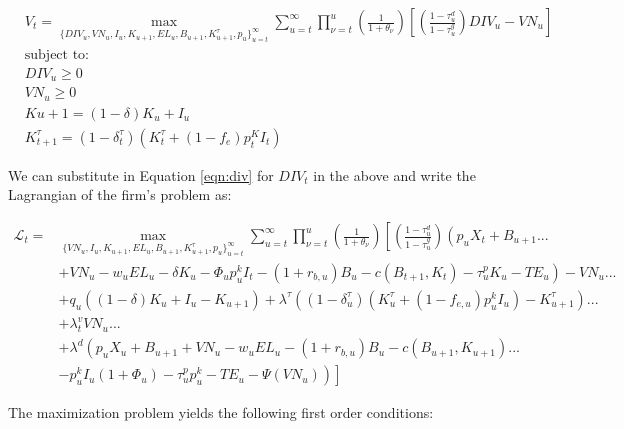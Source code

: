 \begin{equation}
\label{eqn:V_max}
\begin{split}
        &V_{t}= \max_{\{DIV_{u},VN_{u}, I_{u}, K_{u+1}, EL_{u}, B_{u+1}, K^{\tau}_{u+1},p_{u}\}^{\infty}_{u=t}} \sum_{u=t}^{\infty} \prod_{\nu=t}^{u}\left(\frac{1}{1+\theta_{\nu}}\right)\left[ \left(\frac{1-\tau^{d}_{u}}{1-\tau^{g}_{u}}\right)DIV_{u}-VN_{u}\right]\\
        &\text{subject to:} \\
        &DIV_{u}\geq 0\\
        &VN_{u}\geq 0\\
        &K{u+1}=(1-\delta)K_{u}+ I_{u} \\
        &K^{\tau}_{t+1}=(1-\delta^{\tau}_{t})(K^{\tau}_{t} + (1-f_{e})p^{K}_{t}I_{t})
      \end{split}
    \end{equation}

We can substitute in Equation \ref{eqn:div} for $DIV_{t}$ in the above and write the Lagrangian of the firm's problem as:

 \begin{equation}
\label{eqn:lagrangian}
\begin{split}
\mathcal{L}_{t} =& \max_{\{VN_{u}, I_{u}, K_{u+1}, EL_{u}, B_{u+1}, K^{\tau}_{u+1},p_{u}\}^{\infty}_{u=t}}   \sum_{u=t}^{\infty} \prod_{\nu=t}^{u}\left(\frac{1}{1+\theta_{\nu}}\right) \left[ \left(\frac{1-\tau^{d}_{u}}{1-\tau^{g}_{u}}\right) \left(p_{u}X_{t}+ B_{u+1}... \right. \right. \\
& \left. \left.  + VN_{u}-w_{u}EL_{u}-\delta K_{u} -\Phi_{u}p^{k}_{u}I_{t}-(1+r_{b,u})B_{u} - c(B_{t+1},K_{t})-\tau^{p}_{u}K_{u}-TE_{u}\right)  - VN_{u} ...\right. \\
&\left. + q_{u}\left((1-\delta)K_{u}+I_{u}-K_{u+1}\right) + \lambda^{\tau}\left((1-\delta^{\tau}_{u})(K^{\tau}_{u}+(1-f_{e,u})p^{k}_{u}I_{u})-K^{\tau}_{u+1}\right) ...\right. \\
& \left.+ \lambda^{v}_{t}VN_{u} ... \right. \\
& \left. + \lambda^{d}\left(p_{u}X_{u}+ B_{u+1} + VN_{u} - w_{u}EL_{u} - (1+r_{b,u})B_{u} - c(B_{u+1},K_{u+1})... \right.\right.\\
& \left.\left. - p^{k}_{u}I_{u}(1+\Phi_{u}) - \tau^{p}_{u}p^{k}_{u} - TE_{u} -\Psi(VN_{u})\right) \right]
\end{split}
\end{equation}

The maximization problem yields the following first order conditions:

